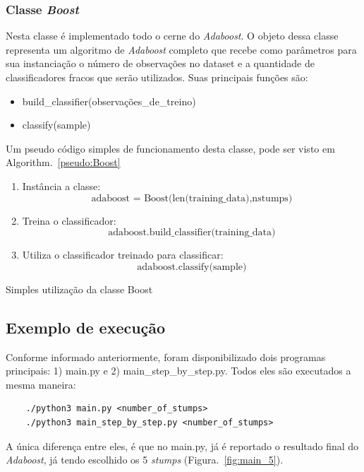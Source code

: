 \subsubsection{Classe \emph{Boost}}
Nesta classe é implementado todo o cerne do \emph{Adaboost}. O objeto dessa classe representa um algoritmo de \emph{Adaboost} completo que recebe como parâmetros para sua instanciação o número de observações no dataset e a quantidade de classificadores fracos que serão utilizados. Suas principais funções são:
	\begin{itemize}
		\item build\_classifier(observações\_de\_treino)
		\item classify(sample)
	\end{itemize}

Um pseudo código simples de funcionamento desta classe, pode ser visto em Algorithm.~\ref{pseudo:Boost}

\begin{algorithm}[htb]
  \begin{enumerate}
    \item Instância a classe:
			\[
				\text{adaboost = Boost(len(training\_data),nstumps)}
			\]
    \item Treina o classificador:
			\[
			 	\text{adaboost.build\_classifier(training\_data)}
			\]
    \item Utiliza o classificador treinado para classificar:
			\[
			 	\text{adaboost.classify(sample)}
			\]
    \end{enumerate}
	\caption{Simples utilização da classe Boost}
	\label{pseudo:Boost}
\end{algorithm}




\subsection{Exemplo de execução}
Conforme informado anteriormente, foram disponibilizado dois programas principais: 1) main.py e 2) main\_step\_by\_step.py. Todos eles são executados a mesma maneira:

\begin{verbatim}
	./python3 main.py <number_of_stumps>
	./python3 main_step_by_step.py <number_of_stumps>
\end{verbatim}

A única diferença entre eles, é que no main.py, já é reportado o resultado final do \emph{Adaboost}, já tendo escolhido os 5 \emph{stumps} (Figura.~\ref{fig:main_5}).

